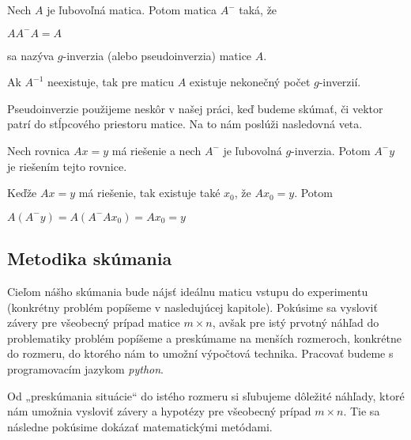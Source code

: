 \begin{defin}
Nech $A$ je ľubovoľná matica. Potom matica $A^-$ taká, že
\begin{center}
$A A^- A = A$
\end{center}
sa nazýva $g$-inverzia (alebo pseudoinverzia) matice $A$.
\end{defin}

\begin{com}
Ak $A^{-1}$ neexistuje, tak pre maticu $A$ existuje nekonečný počet $g$-inverzií.
\end{com}

Pseudoinverzie použijeme neskôr v našej práci, keď budeme skúmať, 
či vektor patrí do stĺpcového priestoru matice. Na to nám poslúži nasledovná veta.

\begin{theorem}
\label{veta3}
Nech rovnica $Ax = y$ má riešenie a nech $A^-$ je ľubovolná $g$-inverzia. Potom $A^- y$ je riešením tejto rovnice.
\end{theorem}

\begin{dokaz}
Keďže $Ax = y$ má riešenie, tak existuje také $x_0$, že $A x_0 = y$. Potom 
\begin{center}
$A (A^- y) = A(A^- A x_0) = A x_0 = y$
\end{center}
\end{dokaz}

\subsection{Metodika skúmania}

Cieľom nášho skúmania bude nájsť ideálnu maticu vstupu do experimentu (konkrétny problém popíšeme v nasledujúcej kapitole). 
Pokúsime sa vysloviť závery pre všeobecný prípad matice $m \times n$,
avšak pre istý prvotný náhľad do problematiky problém popíšeme a preskúmame na menších rozmeroch, 
konkrétne do rozmeru, do ktorého nám to umožní výpočtová technika. Pracovať budeme s programovacím jazykom \textit{python}.

Od „preskúmania situácie“ do istého rozmeru si sľubujeme dôležité náhľady, 
ktoré nám umožnia vysloviť závery a hypotézy pre všeobecný prípad $m \times n$. 
Tie sa následne pokúsime dokázať matematickými metódami.
